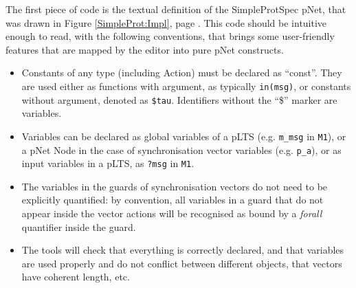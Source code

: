 \documentclass{lmcs}
\newcommand{\TODO}[1]{\textcolor{red}{\textbf{[TODO:#1]}}}
\begin{document}


  

The first piece of code is the textual definition of the SimpleProtSpec
pNet, that was drawn in Figure \ref{SimpleProt:Impl}, page \pageref{SimpleProt:Impl}. This code should be intuitive enough to read, with the following
conventions, that brings some user-friendly features that are mapped by the editor into pure pNet constructs.

\begin{itemize}
  \item Constants of any type (including Action) must be declared as
    ``const''. They are used either as functions with argument, as
    typically \texttt{in(msg)}, or constants without argument, denoted
    as \texttt{\$tau}. Identifiers without the ``\$'' marker are
    variables.
  \item Variables can be declared as global variables of a pLTS (e.g. \texttt{m\_msg} in \texttt{M1}), or a pNet Node in the case of synchronisation vector variables (e.g. \texttt{p\_a}),
    or as input variables in a pLTS, as \texttt{?msg} in \texttt{M1}.
  \item The variables in the guards of synchronisation vectors do not need to be explicitly quantified: by convention, all variables in a guard that do not appear inside the vector actions will be recognised as bound by a \emph{forall} quantifier inside the guard.
    \item The tools will check that everything is correctly declared, and that variables are used properly and do not conflict between different objects, that vectors have coherent length, etc.
\end{itemize}
\bigskip
\end{document}
